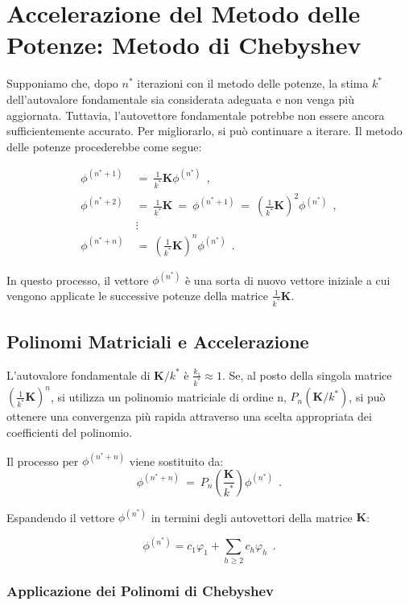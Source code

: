 \chapter{Accelerazione del Metodo delle Potenze: Metodo di Chebyshev}

Supponiamo che, dopo $n^*$ iterazioni con il metodo delle potenze, la stima $k^*$ dell'autovalore fondamentale sia considerata adeguata e non venga più aggiornata. Tuttavia, l'autovettore fondamentale potrebbe non essere ancora sufficientemente accurato. Per migliorarlo, si può continuare a iterare.
Il metodo delle potenze procederebbe come segue:

\[\begin{aligned}
\phi^{(n^* + 1)}\ &=\ \frac{1}{k^*} \mathbf{K} \phi^{(n^*)}\ \ ,\\
\phi^{(n^* + 2)}\ &=\ \frac{1}{k^*} \mathbf{K}\ =\ \phi^{(n^* + 1)}\ =\ \left(\frac{1}{k^*} \mathbf{K}\right)^{2} \phi^{(n^*)}\ \ ,\\
&\vdots\\
\phi^{(n^* + n)}\ &=\ \left(\frac{1}{k^*} \mathbf{K}\right)^{n} \phi^{(n^*)}\ \ .
\end{aligned}\]



In questo processo, il vettore $\phi^{(n^*)}$ è una sorta di nuovo vettore iniziale a cui vengono applicate le successive potenze della matrice $\frac{1}{k^*}\mathbf{K}$.

%
%
\section{Polinomi Matriciali e Accelerazione}

L'autovalore fondamentale di $\mathbf{K}/k^*$  è  $\frac{k_1}{k^*} \approx 1$. Se, al posto della singola matrice $\left(\frac{1}{k^*}\mathbf{K}\right)^n$, si utilizza un polinomio matriciale di ordine n, $P_n\left(\mathbf{K}/k^*\right)$, si può ottenere una convergenza più rapida attraverso una scelta appropriata dei coefficienti del polinomio.

Il processo per $\phi^{(n^* + n)}$ viene sostituito da:
\[\phi^{(n^* + n)}\ =\ P_{n} \left(\frac{\mathbf{K}}{k^*}\right) \phi^{(n^*)}\ \ .\]

Espandendo il vettore $\phi^{(n^*)}$ in termini degli autovettori della matrice $\mathbf{K}$:

\[\phi^{(n^*)} = c_{1} \varphi_{1} + \sum_{h \geq 2} c_{h} \varphi_{h}\ \ .\]


%
%
\subsection{Applicazione dei Polinomi di Chebyshev}

